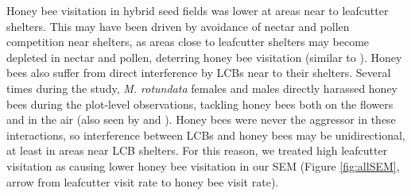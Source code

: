 \documentclass[12pt]{article} %
\begin{document}

Honey bee visitation in hybrid seed fields was lower at areas near to leafcutter shelters. 
This may have been driven by avoidance of nectar and pollen competition near shelters, as areas close to leafcutter shelters may become depleted in nectar and pollen, deterring honey bee visitation (similar to \citealp{currie1997}).
Honey bees also suffer from direct interference by LCBs near to their shelters.
Several times during the study, \textit{M. rotundata} females and males directly harassed honey bees during the plot-level observations, tackling honey bees both on the flowers and in the air (also seen by \citealp{batra1978} and \citealp{waytesMsc}). 
Honey bees were never the aggressor in these interactions, so interference between LCBs and honey bees may be unidirectional, at least in areas near LCB shelters. 
For this reason, we treated high leafcutter visitation as causing lower honey bee visitation in our SEM (Figure \ref{fig:allSEM}, arrow from leafcutter visit rate to honey bee visit rate).
\end{document}
